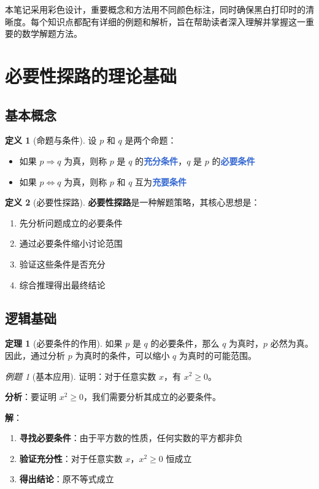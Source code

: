 \documentclass[a4paper,11pt]{ctexart}
\newcommand{\highlight}[1]{\textcolor{highlight}{\textbf{#1}}}
\newcommand{\method}[1]{\textcolor{accent}{\textbf{#1}}}
\newcommand{\keypoint}[1]{\textcolor{secondary}{\textbf{#1}}}
\theoremstyle{definition}
\newtheorem{definition}{定义}[section]
\newtheorem{theorem}{定理}[section]
\theoremstyle{remark}
\newtheorem{example}{例题}[section]
\begin{document}
本笔记采用彩色设计，重要概念和方法用不同颜色标注，同时确保黑白打印时的清晰度。每个知识点都配有详细的例题和解析，旨在帮助读者深入理解并掌握这一重要的数学解题方法。

\newpage

\section{必要性探路的理论基础}

\subsection{基本概念}

\begin{definition}[命题与条件]
设 $p$ 和 $q$ 是两个命题：
\begin{itemize}
    \item 如果 $p \Rightarrow q$ 为真，则称 $p$ 是 $q$ 的\highlight{充分条件}，$q$ 是 $p$ 的\highlight{必要条件}
    \item 如果 $p \Leftrightarrow q$ 为真，则称 $p$ 和 $q$ 互为\highlight{充要条件}
\end{itemize}
\end{definition}

\begin{definition}[必要性探路]
\method{必要性探路}是一种解题策略，其核心思想是：
\begin{enumerate}
    \item 先分析问题成立的必要条件
    \item 通过必要条件缩小讨论范围
    \item 验证这些条件是否充分
    \item 综合推理得出最终结论
\end{enumerate}
\end{definition}

\subsection{逻辑基础}

\begin{theorem}[必要条件的作用]
如果 $p$ 是 $q$ 的必要条件，那么 $q$ 为真时，$p$ 必然为真。因此，通过分析 $p$ 为真时的条件，可以缩小 $q$ 为真时的可能范围。
\end{theorem}

\begin{example}[基本应用]
证明：对于任意实数 $x$，有 $x^2 \geq 0$。

\textbf{分析}：要证明 $x^2 \geq 0$，我们需要分析其成立的必要条件。

\textbf{解}：
\begin{enumerate}
    \item \keypoint{寻找必要条件}：由于平方数的性质，任何实数的平方都非负
    \item \keypoint{验证充分性}：对于任意实数 $x$，$x^2 \geq 0$ 恒成立
    \item \keypoint{得出结论}：原不等式成立
\end{enumerate}
\end{example}
\end{document}
